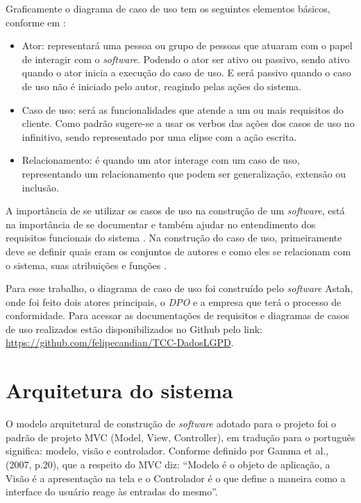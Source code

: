 \documentclass[
	12pt,				%
	openright,			%
	oneside,			%
	a4paper,			%
	english,			%
	french,				%
	spanish,			%
	brazil,				%
	]{abntex2}
\begin{document}
Graficamente o diagrama de caso de uso tem os seguintes elementos básicos, conforme em \cite{Vazquez2016}:

\begin{itemize}
\item Ator: representará uma pessoa ou grupo de pessoas que atuaram com o papel de interagir com o \textit{software}. Podendo o ator ser ativo ou passivo, sendo ativo quando o ator inicia a execução do caso de uso. E será passivo quando o caso de uso não é iniciado pelo autor, reagindo pelas ações do sistema.
\item Caso de uso: será as funcionalidades que atende a um ou mais requisitos do cliente. Como padrão sugere-se a usar os verbos das ações dos casos de uso no infinitivo, sendo representado por uma elipse com a ação escrita.
\item Relacionamento: é quando um ator interage com um caso de uso, representando um relacionamento que podem ser generalização, extensão ou inclusão.
\end{itemize}

A importância de se utilizar os casos de uso na construção de um \textit{software}, está na importância de se documentar e também ajudar no entendimento dos requisitos funcionais do sistema \cite{Fowler2007}. Na construção do caso de uso, primeiramente deve se definir quais eram os conjuntos de autores e como eles se relacionam com o sistema, suas atribuições e funções \cite{Pressman2011}.

Para esse trabalho, o diagrama de caso de uso foi construído pelo \textit{software} Astah, onde foi feito dois atores principais, o \textit{DPO} e a empresa que terá o processo de conformidade. Para acessar as documentações de requisitos e diagramas de casos de uso realizados estão disponibilizados no Github pelo link: \url{https://github.com/felipecandian/TCC-DadosLGPD}.

\pagebreak

\section{Arquitetura do sistema}

O modelo arquitetural de construção de \textit{software} adotado para o projeto foi o padrão de projeto MVC (Model, View, Controller), em tradução para o português significa: modelo, visão e controlador. Conforme definido por Gamma et al., (2007, p.20), que a respeito do MVC diz:  “Modelo é o objeto de aplicação, a Visão é a apresentação na tela e o Controlador é o que define a maneira como a interface do usuário reage às entradas do mesmo”.
\end{document}
